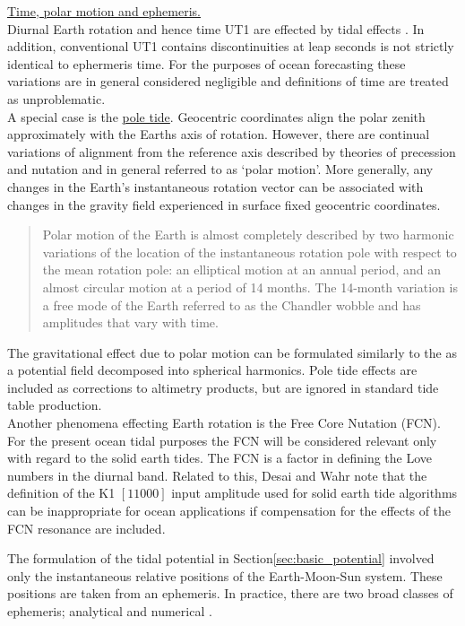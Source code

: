 \underline{Time, polar motion and ephemeris.}\\ 
Diurnal Earth rotation and hence time UT1 are effected by tidal effects \citep[sec 8]{IERS2003}.  In addition, conventional UT1 contains discontinuities at leap seconds is not strictly identical to ephermeris time.  For the purposes of ocean forecasting these variations are in general considered negligible and definitions of time are treated as unproblematic.\\


A special case is the \underline{pole tide}. Geocentric coordinates align the polar zenith approximately with the Earths axis of rotation. However, there are continual variations of alignment from the reference axis described by theories of precession and nutation and in general referred to as `polar motion'.   More generally, any changes in the Earth's instantaneous rotation vector can be associated with changes in the gravity field  experienced in surface fixed geocentric coordinates.\\
\begin{quotation}
Polar motion of the Earth is almost completely described by two harmonic variations of the location of the instantaneous rotation pole with respect to the mean rotation pole: an elliptical motion at an annual period, and an almost circular motion at a period of 14 months. The 14-month variation is a free mode of the Earth referred to as the Chandler wobble and has amplitudes that vary with time. \citep{Desai:2002ev}
\end{quotation}
The gravitational effect due to polar motion can be formulated similarly to the \ATGF{} as a potential field decomposed into spherical harmonics.
Pole tide effects are included as corrections to altimetry products, but are ignored in standard tide table production.\\
Another phenomena effecting Earth rotation is the Free Core Nutation (FCN).  For the present ocean tidal purposes the FCN will be considered relevant only with regard to the solid earth tides.  The FCN is a factor in defining the  Love numbers in the diurnal band.   Related to this, Desai and Wahr note that the definition of the K1 $[1 1 0 0 0]$ input amplitude used for solid earth tide algorithms can be inappropriate for ocean applications if compensation for the effects of the FCN resonance are included\cite{Desai:1995je}.



The formulation of the tidal potential in Section\ref{sec:basic_potential} involved only the instantaneous relative positions of the Earth-Moon-Sun system.   These positions are taken from an ephemeris.  In practice, there are two broad classes of ephemeris; analytical and numerical \citep{Wenzel:1997kn}.


